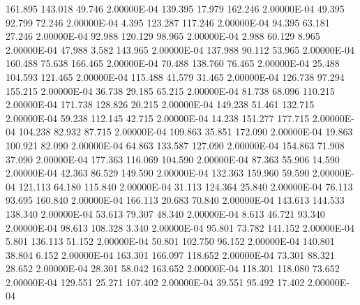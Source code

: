    161.895   143.018    49.746  2.00000E-04
   139.395    17.979   162.246  2.00000E-04
    49.395    92.799    72.246  2.00000E-04
     4.395   123.287   117.246  2.00000E-04
    94.395    63.181    27.246  2.00000E-04
    92.988   120.129    98.965  2.00000E-04
     2.988    60.129     8.965  2.00000E-04
    47.988     3.582   143.965  2.00000E-04
   137.988    90.112    53.965  2.00000E-04
   160.488    75.638   166.465  2.00000E-04
    70.488   138.760    76.465  2.00000E-04
    25.488   104.593   121.465  2.00000E-04
   115.488    41.579    31.465  2.00000E-04
   126.738    97.294   155.215  2.00000E-04
    36.738    29.185    65.215  2.00000E-04
    81.738    68.096   110.215  2.00000E-04
   171.738   128.826    20.215  2.00000E-04
   149.238    51.461   132.715  2.00000E-04
    59.238   112.145    42.715  2.00000E-04
    14.238   151.277   177.715  2.00000E-04
   104.238    82.932    87.715  2.00000E-04
   109.863    35.851   172.090  2.00000E-04
    19.863   100.921    82.090  2.00000E-04
    64.863   133.587   127.090  2.00000E-04
   154.863    71.908    37.090  2.00000E-04
   177.363   116.069   104.590  2.00000E-04
    87.363    55.906    14.590  2.00000E-04
    42.363    86.529   149.590  2.00000E-04
   132.363   159.960    59.590  2.00000E-04
   121.113    64.180   115.840  2.00000E-04
    31.113   124.364    25.840  2.00000E-04
    76.113    93.695   160.840  2.00000E-04
   166.113    20.683    70.840  2.00000E-04
   143.613   144.533   138.340  2.00000E-04
    53.613    79.307    48.340  2.00000E-04
     8.613    46.721    93.340  2.00000E-04
    98.613   108.328     3.340  2.00000E-04
    95.801    73.782   141.152  2.00000E-04
     5.801   136.113    51.152  2.00000E-04
    50.801   102.750    96.152  2.00000E-04
   140.801    38.804     6.152  2.00000E-04
   163.301   166.097   118.652  2.00000E-04
    73.301    88.321    28.652  2.00000E-04
    28.301    58.042   163.652  2.00000E-04
   118.301   118.080    73.652  2.00000E-04
   129.551    25.271   107.402  2.00000E-04
    39.551    95.492    17.402  2.00000E-04